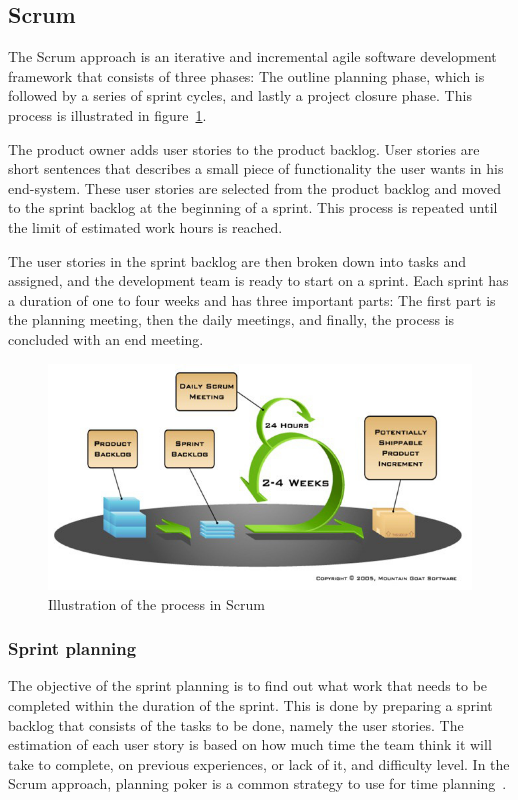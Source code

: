 \newpage
\subsection{Scrum}

\label{sec:scrumProjectManagement}

The Scrum approach is an iterative and incremental agile software development
framework that consists of three phases: The outline planning phase, which is
followed by a series of sprint cycles, and lastly a project closure phase. This process is illustrated in figure~\ref{fig:scrumProcess}.

The product owner adds user stories to the product backlog. User stories are short sentences that describes a small piece of functionality the user wants in his end-system. These user stories are selected from the product backlog and moved to the sprint backlog at the beginning of a sprint. This process is repeated until the limit of estimated work hours is reached. 

The user stories in the sprint backlog are then broken down into tasks and assigned, and the development team is ready to start on a sprint. Each sprint has a duration of one to four weeks and has three important parts: The first part is the
planning meeting, then the daily  meetings, and finally, the process is
concluded with an end meeting. 
\begin{figure}[H]
\includegraphics[width=\textwidth]{ch/projectManagement/fig/sprintProcess.jpg}
\caption{Illustration of the process in Scrum}
\label{fig:scrumProcess}
\end{figure}


\subsubsection{Sprint planning}
\label{sec:sprintplanning}
The objective of the sprint planning is to find out what work that needs to be completed within the duration of the sprint. This is done by preparing a sprint backlog that consists of the tasks to be done, namely the user stories. The estimation of each user story is based on how much time the team think it will take to complete, on previous experiences, or lack of it, and difficulty level. In the Scrum approach, planning poker is a common strategy to use for time planning~\cite{planningpoker}.

